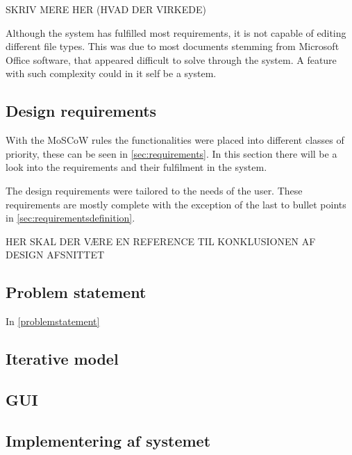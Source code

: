 SKRIV MERE HER (HVAD DER VIRKEDE)

Although the system has fulfilled most requirements, it is not capable of editing different file types. This was due to most documents stemming from Microsoft Office software, that appeared difficult to solve through the system. A feature with such complexity could in it self be a system.

\subsection{Design requirements}
With the MoSCoW rules the functionalities were placed into different classes of priority, these can be seen in \cref{sec:requirements}. In this section there will be a look into the requirements and their fulfilment in the system.

The design requirements were tailored to the needs of the user. These requirements are mostly complete with the exception of the last to bullet points in \cref{sec:requirementsdefinition}. 

HER SKAL DER VÆRE EN REFERENCE TIL KONKLUSIONEN AF DESIGN AFSNITTET

\subsection{Problem statement}
In \cref{problemstatement}

\subsection{Iterative model}

\subsection{GUI}

\subsection{Implementering af systemet}
